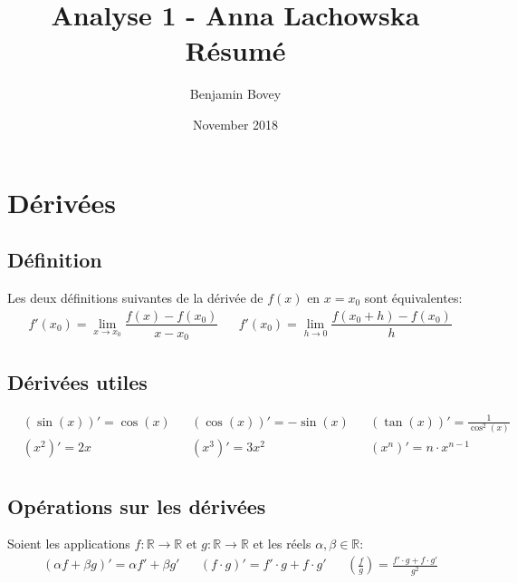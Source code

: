 \documentclass{article}
\title{\vspace{-2cm}Analyse 1 - Anna Lachowska\\Résumé}
\author{Benjamin Bovey}
\date{November 2018}
\numberwithin{equation}{section}
\begin{document}
\maketitle

\section{Dérivées}
\subsection{Définition}
Les deux définitions suivantes de la dérivée de \(f(x)\) en \(x=x_0\) sont équivalentes:
\begin{align*}
	&f'(x_0) = \lim_{x \to x_0} \dfrac{f(x) - f(x_0)}{x - x_0}
	& &f'(x_0) = \lim_{h \to 0} \dfrac{f(x_0 + h) - f(x_0)}{h}
\end{align*}

\subsection{Dérivées utiles}
\begin{align*}
	&(\sin(x))' = \cos(x)		& &(\cos(x))' = -\sin(x)			& &(\tan(x))' = \frac{1}{\cos^2(x)} \\
	&(x^2)' = 2x 				& &(x^3)' = 3x^2				& &(x^n)' = n \cdot x^{n-1} \\
\end{align*}

\subsection{Opérations sur les dérivées}
Soient les applications \(f: \mathbb{R} \to \mathbb{R}\) et \(g: \mathbb{R} \to \mathbb{R}\) et les réels \(\alpha, \beta \in \mathbb{R}\):
\begin{align*}
	&(\alpha f + \beta g)' = \alpha f' + \beta g' 
	& &(f \cdot g)' = f' \cdot g + f \cdot g' 
	& &\left (\frac{f}{g}\right ) = \frac{f' \cdot g + f \cdot g'}{g^2} \\ 
\end{align*}
\end{document}
